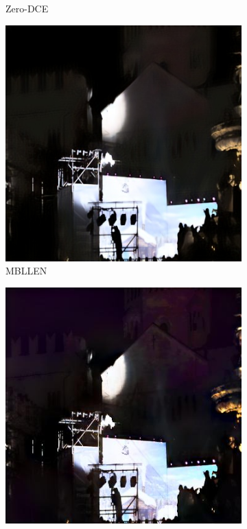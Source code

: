 \documentclass[a4paper]{ctexart}
\begin{document}
\begin{figure}[htb]
\begin{subfigure}{0.19\textwidth}
				\captionsetup{font=scriptsize}
				\caption{Zero-DCE}
				\label{fig: Zero-DCE2}	
			\end{subfigure}
			\begin{subfigure}{0.19\textwidth}
				\includegraphics[width=\linewidth]{picture/LLIE/Experiment/MBLLEN2}
				\captionsetup{font=scriptsize}
				\caption{MBLLEN}
				\label{fig: MBLLEN2}
			\end{subfigure}
			\begin{subfigure}{0.19\textwidth}
				\includegraphics[width=\linewidth]{picture/LLIE/Experiment/EnlightenGAN2}

\end{subfigure}
\end{figure}
\end{document}
